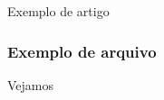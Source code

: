\begin{frame}[standout]
  \Huge
  Exemplo de artigo
\end{frame}

\begin{frame}
  \frametitle{Exemplo de arquivo}
  \Huge
  Vejamos 
\end{frame}
